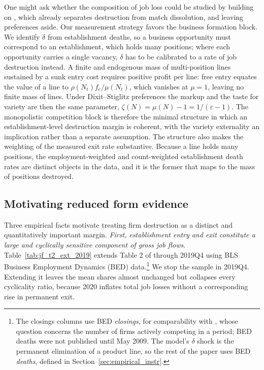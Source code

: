 \documentclass[authoryear, review, 12pt]{elsarticle}
\begin{document}
	One might ask whether the composition of job loss could be
	studied by building on \citet{gabrovski_2025}, which already
	separates destruction from match dissolution, and leaving
	preferences aside. Our measurement strategy favors the
	business formation block. We identify $\delta$ from
	establishment deaths, so a business opportunity must
	correspond to an establishment, which holds many positions;
	where each opportunity carries a single vacancy, $\delta$
	has to be calibrated to a rate of job destruction instead. A
	finite and endogenous mass of multi-position lines sustained
	by a sunk entry cost requires positive profit per line: free
	entry equates the value of a line to
	$\rho(N_t)f_e/\mu(N_t)$, which vanishes at $\mu=1$, leaving
	no finite mass of lines. Under Dixit--Stiglitz preferences
	the markup and the taste for variety are then the same
	parameter, $\zeta(N)=\mu(N)-1=1/(\varepsilon-1)$. The
	monopolistic competition block is therefore the minimal structure in
	which an establishment-level destruction margin is coherent,
	with the variety externality an implication rather than a
	separate assumption. The structure also makes the weighting
	of the measured exit rate substantive. Because a line holds
	many positions, the employment-weighted and count-weighted
	establishment death rates are distinct objects in the data,
	and it is the former that maps to the mass of positions
	destroyed.
	\subsection{Motivating reduced form evidence}
	Three empirical facts motivate treating firm destruction as a distinct and quantitatively
	important margin. \textit{First, establishment entry and exit constitute a large and
	cyclically sensitive component of gross job flows}. Table~\ref{tab:jf_t2_ext_2019} extends
	Table 2 of \citet{jaimovich_2008} through 2019Q4 using BLS Business Employment Dynamics
	(BED) data.\footnote{The closings columns use BED \emph{closings}, for comparability with
	\citet{jaimovich_2008}, whose question concerns the number of firms actively competing in a
	period; BED deaths were not published until May 2009. The model's $\delta$ shock is the
	permanent elimination of a product line, so the rest of the paper uses BED \emph{deaths},
	defined in Section~\ref{sec:empirical_instr}.} We stop the sample in 2019Q4. Extending it
	leaves the mean shares almost unchanged but collapses every cyclicality ratio, because 2020
	inflates total job losses without a corresponding rise in permanent exit.
\end{document}
